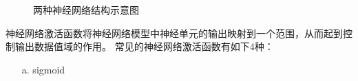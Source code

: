 \documentclass[AutoFakeBold]{LZUThesis}
\begin{document}
\begin{figure}[H]
	\centering
    \caption{两种神经网络结构示意图}
    \label{fig_nn}
\end{figure}

神经网络激活函数将神经网络模型中神经单元的输出映射到一个范围，从而起到控制输出数据值域的作用。
常见的神经网络激活函数有如下4种：
\begin{itemize}
\item[a. ] sigmoid
\end{itemize}
\end{document}
